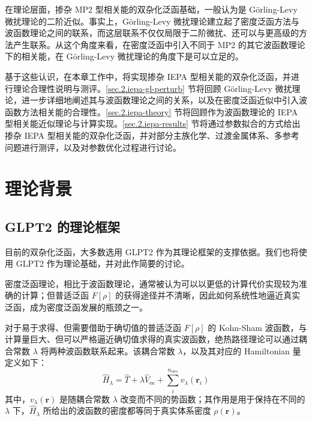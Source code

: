 在理论层面，掺杂 MP2 型相关能的双杂化泛函基础，一般认为是 G\"orling-Levy 微扰理论的二阶近似。事实上，G\"orling-Levy 微扰理论建立起了密度泛函方法与波函数理论之间的联系，而这层联系不仅仅局限于二阶微扰、还可以与更高级的方法产生联系。从这个角度来看，在密度泛函中引入不同于 MP2 的其它波函数理论下的相关能，在 G\"orling-Levy 微扰理论的角度下是可以立足的。

基于这些认识，在本章工作中，将实现掺杂 IEPA 型相关能的双杂化泛函，并进行理论合理性说明与测评。\ref{sec.2.iepa-gl-perturb} 节将回顾 G\"orling-Levy 微扰理论，进一步详细地阐述其与波函数理论之间的关系，以及在密度泛函近似中引入波函数方法相关能的合理性。\ref{sec.2.iepa-theory} 节将回顾作为波函数理论的 IEPA 型相关能近似理论与计算实现。\ref{sec.2.iepa-results} 节将通过参数拟合的方式给出掺杂 IEPA 型相关能的双杂化泛函，并对部分主族化学、过渡金属体系、多参考问题进行测评，以及对参数优化过程进行讨论。

\section{理论背景}

\subsection{GLPT2 的理论框架}

目前的双杂化泛函，大多数选用 GLPT2 作为其理论框架的支撑依据。我们也将使用 GLPT2 作为理论基础，并对此作简要的讨论。

密度泛函理论，相比于波函数理论，通常被认为可以以更低的计算代价实现较为准确的计算；但普适泛函 $F[\rho]$ 的获得途径并不清晰，因此如何系统性地逼近真实泛函，成为密度泛函发展的瓶颈之一。

对于易于求得、但需要借助于确切值的普适泛函 $F[\rho]$ 的 Kohn-Sham 波函数，与计算量巨大、但可以严格逼近确切值求得的真实波函数，绝热路径理论可以通过耦合常数 $\lambda$ 将两种波函数联系起来。该耦合常数 $\lambda$，以及其对应的 Hamiltonian 量定义如下：
\begin{equation}
  \label{eq.2.H-lambda-ac}
  \hat H_\lambda = \hat T + \lambda \hat V_\mathrm{ee} + \sum_i^{n_\mathrm{elec}} v_{\lambda}(\bm{r}_i)
\end{equation}
其中，$v_{\lambda}(\bm{r})$ 是随耦合常数 $\lambda$ 改变而不同的势函数；其作用是用于保持在不同的 $\lambda$ 下，$\hat H_\lambda$ 所给出的波函数的密度都等同于真实体系密度 $\rho(\bm{r})$。

